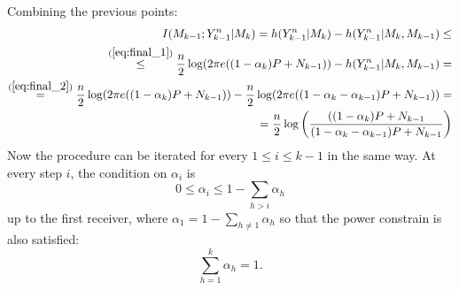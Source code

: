 Combining the previous points:
\begin{align}
  \begin{split}
    I(M_{k-1};Y^n_{k-1}|M_k) = h(Y_{k-1}^n|M_{k}) - h(Y_{k-1}^n|M_k,M_{k-1})\leq\\
    \overset{(\ref{eq:final_1})}{\leq} \frac{n}{2}\log(2\pi e ((1-\alpha_k) P+N_{k-1})) - h(Y_{k-1}^n|M_k,M_{k-1}) =\\
    \overset{(\ref{eq:final_2})}{=}\frac{n}{2}\log(2\pi e ((1-\alpha_k) P+N_{k-1}))-\frac{n}{2}\log(2\pi e ((1-\alpha_k-\alpha_{k-1}) P+N_{k-1}))=\\
    = \frac{n}{2}\log\left(\frac{((1-\alpha_k) P+N_{k-1}}{(1-\alpha_k-\alpha_{k-1}) P+N_{k-1}}\right)
  \end{split}
  \label{eq:final_k-1}
\end{align}
Now the procedure can be iterated for every $1\leq i\leq k-1$ in the same way. At every step $i$, the condition on $\alpha_i$ is
\begin{equation}
  0\leq \alpha_i \leq 1-\sum_{h>i}\alpha_h
\end{equation}
up to the first receiver, where $\alpha_1 = 1-\sum_{h\neq 1}\alpha_h$ so that the power constrain is also satisfied:
\begin{equation}
\sum_{h = 1}^k \alpha_h = 1.
\end{equation}

